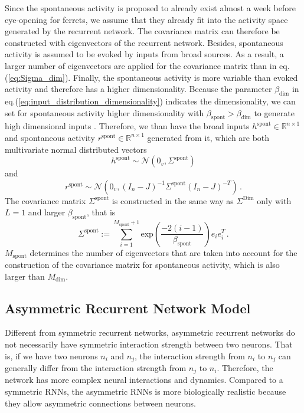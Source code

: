 \documentclass[11pt]{article}
\begin{document}
	Since the spontaneous activity is proposed to already exist almost a week before eye-opening for ferrets, we assume that they already fit into the activity space generated by the recurrent network. The covariance matrix can therefore be constructed with eigenvectors of the recurrent network. Besides, spontaneous activity is assumed to be evoked by inputs from broad sources. As a result, a larger number of eigenvectors are applied for the covariance matrix than in eq.(\ref{eq:Sigma_dim}). 
	Finally, the spontaneous activity is more variable than evoked activity and therefore has a higher dimensionality. Because the parameter $\beta_{\text{dim}}$ in eq.(\ref{eq:input_distribution_dimensionality}) indicates the dimensionality, we can set for spontaneous activity higher dimensionality with $\beta_{\text{spont}} > \beta_{\text{dim}}$ to generate high dimensional inputs \cite{tragenap2023nature}. 
	Therefore, we than have the broad inputs $h^{\text{spont}} \in \mathbb{R}^{n \times 1}$ and spontaneous activity $r^{\text{spont}} \in \mathbb{R}^{n \times 1}$ generated from it, which are both multivariate normal distributed vectors 
		\begin{equation}
			h^{\text{spont}} \sim \mathcal{N}(0_v, \Sigma^{\text{spont}})
		\end{equation}
	and 
		\begin{equation}
			r^{\text{spont}} \sim \mathcal{N}\left( 0_v, (I_n - J)^{-1} \Sigma^{\text{spont}}(I_n - J)^{-T}\right) \, .
		\end{equation}
	The covariance matrix $\Sigma^{\text{spont}}$ is constructed in the same way as $\Sigma^{\text{Dim}}$ only with $L=1$ and larger $\beta_{\text{spont}}$, that is
		\begin{equation} \label{eq:Sigma_spont}
			\Sigma^{\text{spont}} := \sum_{i=1}^{M_{\text{spont}}+1} \text{exp}\left(\frac{-2(i-1)}{\beta_{\text{spont}}}\right) e_i e_i^T \, .
		\end{equation}
	$M_{\text{spont}}$ determines the number of eigenvectors that are taken into account for the construction of the covariance matrix for spontaneous activity, which is also larger than $M_{\text{dim}}$.
	
	\clearpage
	\subsection{Asymmetric Recurrent Network Model} \label{sec:ffrec_asym}
	Different from symmetric recurrent networks, asymmetric recurrent networks do not necessarily have symmetric interaction strength between two neurons. That is, if we have two neurons $n_i$ and $n_j$, the interaction strength from $n_i$ to $n_j$ can generally differ from the interaction strength from $n_j$ to $n_i$. Therefore, the network has more complex neural interactions and dynamics. Compared to a symmetric RNNs, the asymmetric RNNs is more biologically realistic because they allow asymmetric connections between neurons. 
	
\end{document}
